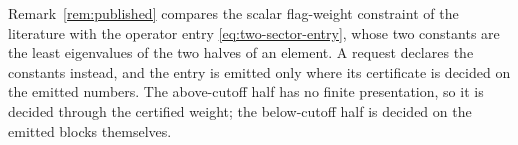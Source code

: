 
Remark~\ref{rem:published} compares the scalar flag-weight constraint of
the literature with the operator entry \eqref{eq:two-sector-entry}, whose two
constants are the least eigenvalues of the two halves of an element. A
request declares the constants instead, and the entry is emitted only where
its certificate is decided on the emitted numbers. The above-cutoff half has
no finite presentation, so it is decided through the certified weight; the
below-cutoff half is decided on the emitted blocks themselves.

